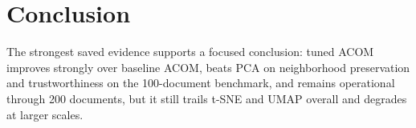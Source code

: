 \section{Conclusion}

The strongest saved evidence supports a focused conclusion: tuned ACOM improves strongly over baseline ACOM, beats PCA on neighborhood preservation and trustworthiness on the 100-document benchmark, and remains operational through 200 documents, but it still trails t-SNE and UMAP overall and degrades at larger scales.
